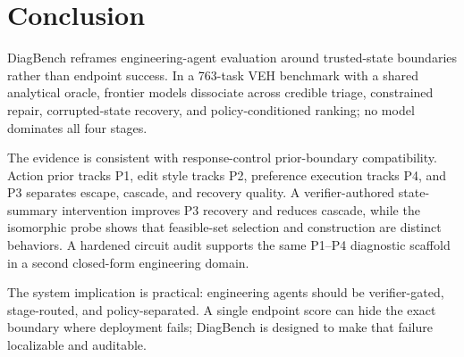 \section{Conclusion}
\label{sec:conclusion}

DiagBench reframes engineering-agent evaluation around trusted-state boundaries rather than endpoint success. In a 763-task VEH benchmark with a shared analytical oracle, frontier models dissociate across credible triage, constrained repair, corrupted-state recovery, and policy-conditioned ranking; no model dominates all four stages.

The evidence is consistent with response-control prior-boundary compatibility. Action prior tracks P1, edit style tracks P2, preference execution tracks P4, and P3 separates escape, cascade, and recovery quality. A verifier-authored state-summary intervention improves P3 recovery and reduces cascade, while the isomorphic probe shows that feasible-set selection and construction are distinct behaviors. A hardened circuit audit supports the same P1--P4 diagnostic scaffold in a second closed-form engineering domain.

The system implication is practical: engineering agents should be verifier-gated, stage-routed, and policy-separated. A single endpoint score can hide the exact boundary where deployment fails; DiagBench is designed to make that failure localizable and auditable.
